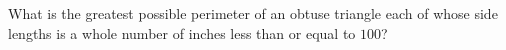 What is the greatest possible perimeter of an obtuse triangle each of whose side lengths is a whole number of inches less than or equal to $100$?
